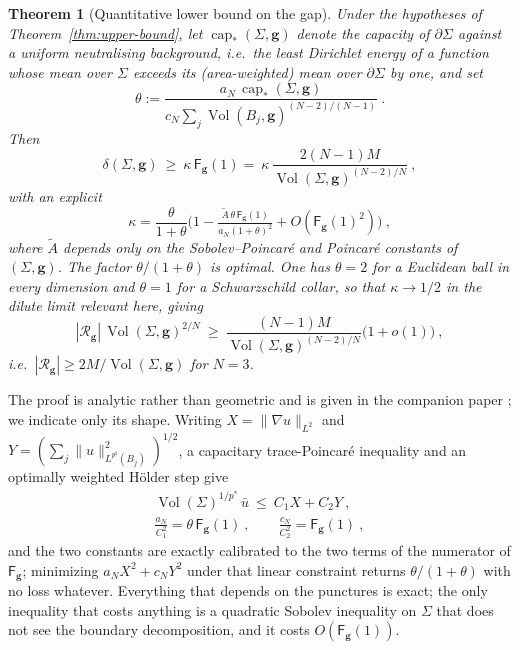 \documentclass[aps,prd,reprint,amsmath,amssymb,nofootinbib,longbibliography]{revtex4-2}
\DeclareMathOperator{\Vol}{Vol}
\newcommand{\g}{\mathbf{g}}                 %
\newcommand{\Rs}{\mathcal{R}}               %
\newcommand{\cpst}{\operatorname{cap}_*}    %
\newcommand{\Atil}{\widetilde{A}}
\newcommand{\pstar}{p^{*}}
\newcommand{\psharp}{p^{\sharp}}
\newcommand{\aN}{a_N}
\newcommand{\cN}{c_N}
\newcommand{\Fq}{\mathsf{F}}                %
\theoremstyle{plain}
\newtheorem{theorem}{Theorem}
\theoremstyle{definition}
\theoremstyle{remark}
\begin{document}
\begin{theorem}[Quantitative lower bound on the gap]
\label{thm:lower-bound}
Under the hypotheses of Theorem~\ref{thm:upper-bound}, let $\cpst(\Sigma,\g)$ denote the capacity of $\partial\Sigma$ against a uniform neutralising background, i.e.\ the least Dirichlet energy of a function whose mean over $\Sigma$ exceeds its (area-weighted) mean over $\partial\Sigma$ by one, and set
\begin{equation}
\label{eq:theta-def}
\theta:=\frac{\aN\,\cpst(\Sigma,\g)}{\cN\sum_j\Vol(B_j,\g)^{(N-2)/(N-1)}}\ .
\end{equation}
Then
\begin{equation}
\label{eq:lower-bound}
\delta(\Sigma,\g)\ \ge\ \kappa\,\Fq_\g(1)
 =\ \kappa\,\frac{2(N-1)M}{\Vol(\Sigma,\g)^{(N-2)/N}}\ ,
\end{equation}
with an explicit
\begin{equation}
\label{eq:kappa}
\kappa=\frac{\theta}{1+\theta}\Big(1-\tfrac{\Atil\,\theta\,\Fq_\g(1)}{\aN(1+\theta)^2}+O(\Fq_\g(1)^2)\Big)\ ,
\end{equation}
where $\Atil$ depends only on the Sobolev--Poincar\'e and Poincar\'e constants of $(\Sigma,\g)$. The factor $\theta/(1+\theta)$ is optimal. One has $\theta=2$ for a Euclidean ball in every dimension and $\theta=1$ for a Schwarzschild collar, so that $\kappa\to1/2$ in the dilute limit relevant here, giving
\begin{equation}
\label{eq:R-bound}
|\Rs_\g|\,\Vol(\Sigma,\g)^{2/N}\ \ge\ \frac{(N-1)M}{\Vol(\Sigma,\g)^{(N-2)/N}}\big(1+o(1)\big)\ ,
\end{equation}
i.e.\ $|\Rs_\g|\ge2M/\Vol(\Sigma,\g)$ for $N=3$.
\end{theorem}

The proof is analytic rather than geometric and is given in the companion paper \cite{BrunswicPerforated}; we indicate only its shape. Writing $X=\|\nabla u\|_{L^2}$ and $Y=(\sum_j\|u\|^2_{L^{\psharp}(B_j)})^{1/2}$, a capacitary trace-Poincar\'e inequality and an optimally weighted H\"older step give
\begin{gather*}
\Vol(\Sigma)^{1/\pstar}\,\bar u\ \le\ C_1X+C_2Y\ ,\\[2pt]
\frac{\aN}{C_1^2}=\theta\,\Fq_\g(1)\ ,\qquad \frac{\cN}{C_2^2}=\Fq_\g(1)\ ,
\end{gather*}
and the two constants are exactly calibrated to the two terms of the numerator of $\Fq_\g$; minimizing $\aN X^2+\cN Y^2$ under that linear constraint returns $\theta/(1+\theta)$ with no loss whatever. Everything that depends on the punctures is exact; the only inequality that costs anything is a quadratic Sobolev inequality on $\Sigma$ that does not see the boundary decomposition, and it costs $O(\Fq_\g(1))$.
\end{document}
